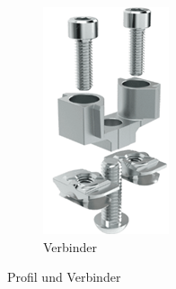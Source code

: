 \begin{figure}[H]
\begin{subfigure}[b]{0.2\textwidth}
        \includegraphics[width=\textwidth]{image/profil2.png}
        \caption{Verbinder}
        \label{fig:bild2}
    \end{subfigure}
    \caption{Profil und Verbinder}
    \label{fig:zwei_bilder}
\end{figure}
\pagebreak

